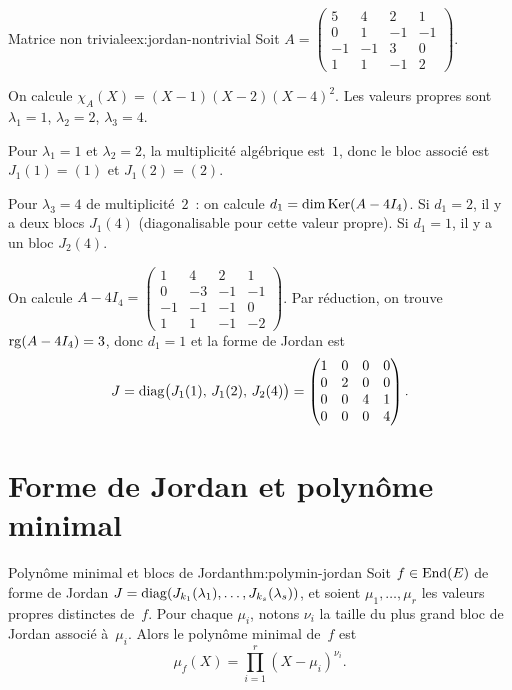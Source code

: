 \begin{example}{Matrice non triviale}{ex:jordan-nontrivial}
  Soit $A=\begin{pmatrix}5&4&2&1\\0&1&-1&-1\\-1&-1&3&0\\1&1&-1&2\end{pmatrix}$.

  On calcule $\chi_A(X)=(X-1)(X-2)(X-4)^2$. Les valeurs propres sont
  $\lambda_1=1$, $\lambda_2=2$, $\lambda_3=4$.

  Pour $\lambda_1=1$ et $\lambda_2=2$, la multiplicité algébrique
  est~$1$, donc le bloc associé est $J_1(1)=(1)$ et $J_1(2)=(2)$.

  Pour $\lambda_3=4$ de multiplicité~$2$~: on calcule
  $d_1=\dim\operatorname{Ker}(A-4I_4)$. Si $d_1=2$, il y a deux blocs $J_1(4)$
  (diagonalisable pour cette valeur propre). Si $d_1=1$, il y a un
  bloc $J_2(4)$.

  On calcule
  $A-4I_4=\begin{pmatrix}1&4&2&1\\0&-3&-1&-1\\-1&-1&-1&0\\1&1&-1&-2\end{pmatrix}$.
  Par réduction, on trouve $\operatorname{rg}(A-4I_4)=3$, donc $d_1=1$ et la forme
  de Jordan est
  \[
    J=\operatorname{diag}\bigl(J_1(1),\,J_1(2),\,J_2(4)\bigr)
    =\begin{pmatrix}1&0&0&0\\0&2&0&0\\0&0&4&1\\0&0&0&4\end{pmatrix}.
  \]
\end{example}


\section{Forme de Jordan et polynôme minimal}\label{sec:jordan-polymin}

\begin{theorem}{Polynôme minimal et blocs de Jordan}{thm:polymin-jordan}
  Soit $f\in\operatorname{End}(E)$ de forme de Jordan
  $J=\operatorname{diag}(J_{k_1}(\lambda_1),\ldots,J_{k_s}(\lambda_s))$, et soient
  $\mu_1,\ldots,\mu_r$ les valeurs propres distinctes de~$f$.
  Pour chaque $\mu_i$, notons $\nu_i$ la taille du plus grand bloc de
  Jordan associé à~$\mu_i$.
  Alors le polynôme minimal de~$f$ est
  \[
    \mu_f(X)=\prod_{i=1}^{r}(X-\mu_i)^{\nu_i}.
  \]
\end{theorem}

